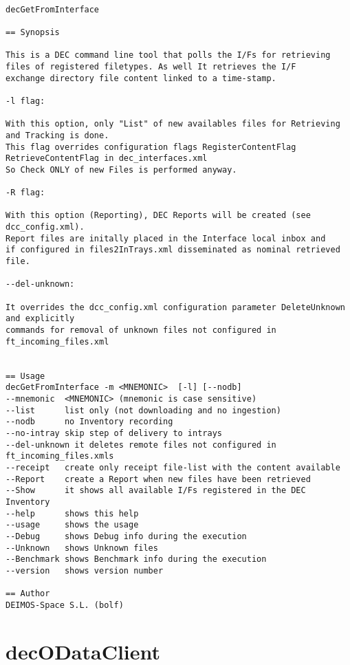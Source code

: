 \documentclass[dec_sum_main.tex]{subfiles}
\begin{document}
\begin{verbatim}

decGetFromInterface 

== Synopsis

This is a DEC command line tool that polls the I/Fs for retrieving 
files of registered filetypes. As well It retrieves the I/F 
exchange directory file content linked to a time-stamp.

-l flag:

With this option, only "List" of new availables files for Retrieving and Tracking is done.
This flag overrides configuration flags RegisterContentFlag RetrieveContentFlag in dec_interfaces.xml
So Check ONLY of new Files is performed anyway.

-R flag:

With this option (Reporting), DEC Reports will be created (see dcc_config.xml). 
Report files are initally placed in the Interface local inbox and
if configured in files2InTrays.xml disseminated as nominal retrieved file.

--del-unknown:

It overrides the dcc_config.xml configuration parameter DeleteUnknown and explicitly
commands for removal of unknown files not configured in ft_incoming_files.xml


== Usage
decGetFromInterface -m <MNEMONIC>  [-l] [--nodb]
--mnemonic  <MNEMONIC> (mnemonic is case sensitive)
--list      list only (not downloading and no ingestion)
--nodb      no Inventory recording
--no-intray skip step of delivery to intrays
--del-unknown it deletes remote files not configured in ft_incoming_files.xmls
--receipt   create only receipt file-list with the content available
--Report    create a Report when new files have been retrieved
--Show      it shows all available I/Fs registered in the DEC Inventory
--help      shows this help
--usage     shows the usage
--Debug     shows Debug info during the execution
--Unknown   shows Unknown files
--Benchmark shows Benchmark info during the execution
--version   shows version number

== Author
DEIMOS-Space S.L. (bolf)

\end{verbatim}


\section{decODataClient}
\label{decODataClient}
\end{document}
